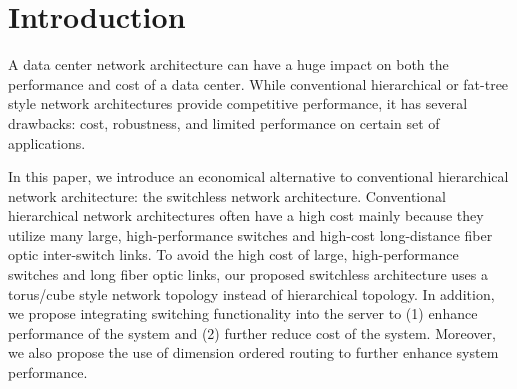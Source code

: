 \vspace{-0.1in}
\section{Introduction}
\label{sec:intro}
A data center network architecture can have a huge impact on both the performance and cost of a data center. While conventional hierarchical or fat-tree style network architectures provide competitive performance, it has several drawbacks: cost, robustness, and limited performance on certain set of applications. 

In this paper, we introduce an economical alternative to conventional hierarchical network architecture: the switchless network architecture. Conventional hierarchical network architectures often have a high cost mainly because they utilize many large, high-performance switches and high-cost long-distance fiber optic inter-switch links. To avoid the high cost of large, high-performance switches and long fiber optic links, our proposed switchless architecture uses a torus/cube style network topology instead of hierarchical topology. In addition, we propose integrating switching functionality into the server to (1) enhance performance of the system and (2) further reduce cost of the system. Moreover, we also propose the use of dimension ordered routing to further enhance system performance.
